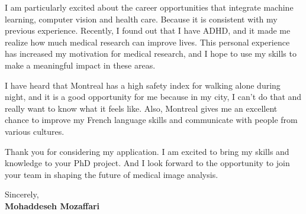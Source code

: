 \documentclass[letterpaper,11pt]{letter}
\begin{document}
I am particularly excited about the career opportunities that integrate machine learning, computer vision and health care. Because it is consistent with my previous experience. Recently, I found out that I have ADHD, and it made me realize how much medical research can improve lives. This personal experience has increased my motivation for medical research, and I hope to use my skills to make a meaningful impact in these areas.

I have heard that Montreal has a high safety index for walking alone during night, and it is a good opportunity for me because in my city, I can't do that and really want to know what it feels like. Also, Montreal gives me an excellent chance to improve my French language skills and communicate with people from various cultures.

Thank you for considering my application. I am excited to bring my skills and knowledge to your PhD project. And I look forward to the opportunity to join your team in shaping the future of medical image analysis.



\begin{flushleft}
    Sincerely, \\
    \textbf{Mohaddeseh Mozaffari}
\end{flushleft}
\end{document}
